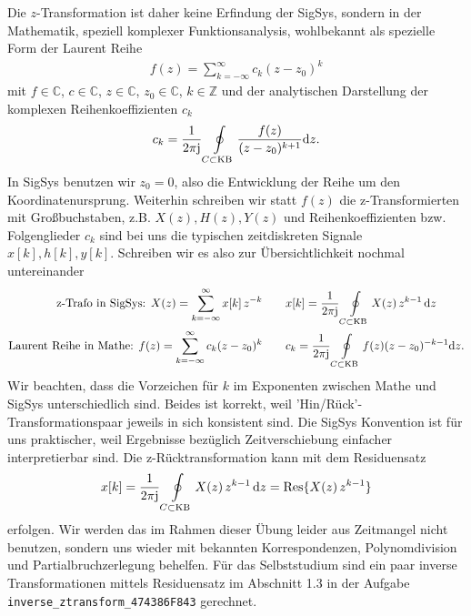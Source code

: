 %
Die $z$-Transformation ist daher keine Erfindung der SigSys, sondern in der
Mathematik, speziell komplexer Funktionsanalysis, wohlbekannt als spezielle
Form der Laurent Reihe~\cite[S.\,56ff]{Wunsch1972}
\begin{align}
f(z) = \sum_{k=-\infty}^{\infty} c_k (z - z_0)^k
\end{align}
mit $f\in\mathbb{C}$, $c\in\mathbb{C}$, $z\in\mathbb{C}$, $z_0\in\mathbb{C}$, $k\in\mathbb{Z}$
und der analytischen Darstellung der komplexen Reihenkoeffizienten $c_k$
\begin{align}
c_k = \frac{1}{2\pi\im}\oint\limits_{C \subset \text{KB}}
\frac{f(z)}{(z-z_0)^{k+1}}\fsd z.
\end{align}
%
In SigSys benutzen wir $z_0=0$, also die Entwicklung der Reihe um den
Koordinatenursprung.
%
Weiterhin schreiben wir statt $f(z)$ die z-Transformierten mit Großbuchstaben,
z.B. $X(z), H(z), Y(z)$ und Reihenkoeffizienten bzw. Folgenglieder $c_k$
sind bei uns die typischen
zeitdiskreten Signale $x[k], h[k], y[k]$.
%
Schreiben wir es also zur Übersichtlichkeit nochmal untereinander
\begin{align}
\text{z-Trafo in SigSys:   } X(z) = \sum_{k=-\infty}^{\infty} x[k] \, z^{-k}\qquad
&x[k] = \frac{1}{2\pi \im} \oint\limits_{C \subset \text{KB}} X(z) \, z^{k-1} \, \fsd z\\
\text{Laurent Reihe in Mathe:   } f(z) = \sum_{k=-\infty}^{\infty} c_k (z - z_0)^k\qquad
&c_k = \frac{1}{2\pi\im}\oint\limits_{C \subset \text{KB}}
f(z) (z-z_0)^{-k-1}\fsd z.
\end{align}
Wir beachten, dass die Vorzeichen für $k$ im Exponenten zwischen Mathe und SigSys
unterschiedlich sind.
%
Beides ist korrekt, weil 'Hin/Rück'-Transformationspaar jeweils in sich
konsistent sind.
%
Die SigSys Konvention ist für uns praktischer, weil Ergebnisse
bezüglich Zeitverschiebung einfacher interpretierbar sind.
%
Die z-Rücktransformation kann mit dem Residuensatz
\begin{align}
x[k] = \frac{1}{2\pi \im} \oint\limits_{C \subset \text{KB}} X(z) \, z^{k-1} \, \fsd z
= \text{Res}\{X(z) \, z^{k-1}\}
\end{align}
erfolgen.
%
Wir werden das im Rahmen dieser Übung leider
aus Zeitmangel nicht benutzen, sondern uns wieder mit bekannten Korrespondenzen,
Polynomdivision und Partialbruchzerlegung behelfen.
%
Für das Selbststudium sind ein paar inverse Transformationen mittels Residuensatz
im Abschnitt 1.3 in der Aufgabe \texttt{inverse\_ztransform\_474386F843}
gerechnet.


